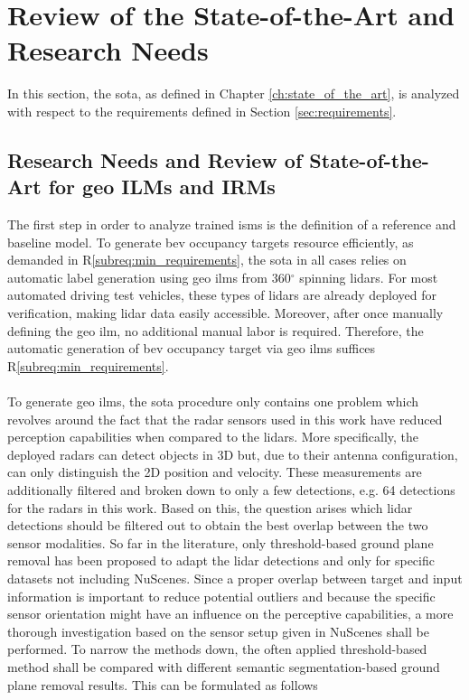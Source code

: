 \section{Review of the State-of-the-Art and Research Needs}
\label{sec:research_needs}
In this section, the \gls{sota}, as defined in Chapter \ref{ch:state_of_the_art}, is analyzed with respect to the requirements defined in Section \ref{sec:requirements}.
%
\subsection{Research Needs and Review of State-of-the-Art for geo ILMs and IRMs}
\label{subsec:research_needs_for_geo_ilms_n_irms}
The first step in order to analyze trained \gls{ism}s is the definition of a reference and baseline model. To generate \gls{bev} occupancy targets resource efficiently, as demanded in R\ref{subreq:min_requirements}, the \gls{sota} in all cases relies on automatic label generation using geo \gls{ilm}s from 360$^\circ$ spinning lidars. For most automated driving test vehicles, these types of lidars are already deployed for verification, making lidar data easily accessible. Moreover, after once manually defining the geo \gls{ilm}, no additional manual labor is required. Therefore, the automatic generation of \gls{bev} occupancy target via geo \gls{ilm}s suffices R\ref{subreq:min_requirements}.
\\\\
To generate geo \gls{ilm}s, the \gls{sota} procedure only contains one problem which revolves around the fact that the radar sensors used in this work have reduced perception capabilities when compared to the lidars. More specifically, the deployed radars can detect objects in 3D but, due to their antenna configuration, can only distinguish the 2D position and velocity. These measurements are additionally filtered and broken down to only a few detections, e.g. 64 detections for the radars in this work. Based on this, the question arises which lidar detections should be filtered out to obtain the best overlap between the two sensor modalities. So far in the literature, only threshold-based ground plane removal has been proposed to adapt the lidar detections and only for specific datasets not including NuScenes. Since a proper overlap between target and input information is important to reduce potential outliers and because the specific sensor orientation might have an influence on the perceptive capabilities, a more thorough investigation based on the sensor setup given in NuScenes shall be performed. To narrow the methods down, the often applied threshold-based method shall be compared with different semantic segmentation-based ground plane removal results. This can be formulated as follows
